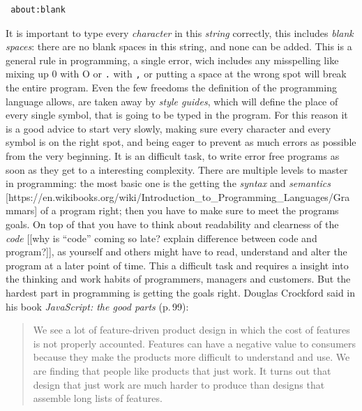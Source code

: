\documentclass[a4paper,10pt]{scrbook}
\begin{document}
\lstset{basicstyle=\ttfamily}
\begin{lstlisting}
 about:blank
\end{lstlisting}

It is important to type every \emph{character} in this \emph{string} correctly, this includes \emph{blank spaces}:
there are no blank spaces in this string, and none can be added.
This is a general rule in programming, a single error, wich includes any misspelling like mixing up 0 with O or \texttt{.} with \texttt{,} or putting a space at the wrong spot will break the entire program.
Even the few freedoms the definition of the programming language allows, are taken away by \emph{style guides}, which will define the place of every single symbol, that is going to be typed in the program.
For this reason it is a good advice to start very slowly, making sure every character and every symbol is on the right spot, and being eager to prevent as much errors as possible from the very beginning.
It is an difficult task, to write error free programs as soon as they get to a interesting complexity.
There are multiple levels to master in programming:
the most basic one is the getting the \emph{syntax} and \emph{semantics} [https://en.wikibooks.org/wiki/Introduction\_to\_Programming\_Languages/Grammars] of a program right;
then you have to make sure to meet the programs goals.
On top of that you have to think about readability and clearness of the \emph{code} [[why is ``code'' coming so late? explain difference between code and program?]], as yourself and others might have to read, understand and alter the program at a later point of time.
This a difficult task and requires a insight into the thinking and work habits of programmers, managers and customers.
But the hardest part in programming is getting the goals right.
Douglas Crockford said in his book \emph{JavaScript: the good parts} (p.\,99):
\begin{quotation}
 We see a lot of feature-driven product design in which the cost of features is not properly accounted.
 Features can have a negative value to consumers because they make the products more difficult to understand and use.
 We are finding that people like products that just work.
 It turns out that design that just work are much harder to produce than designs that assemble long lists of features.
\end{quotation}
\end{document}
